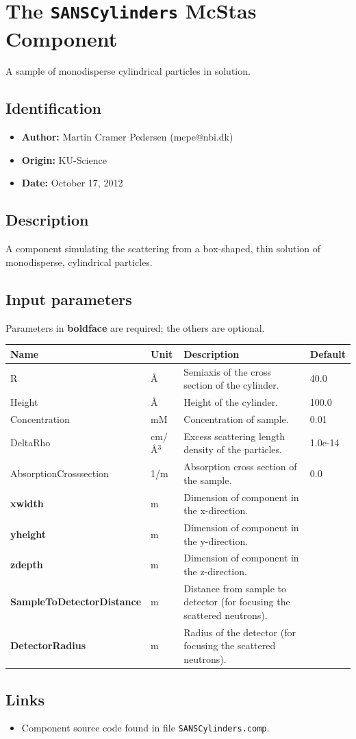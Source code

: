 \section{The \texttt{SANSCylinders} McStas Component}
A sample of monodisperse cylindrical particles in solution.

\subsection*{Identification}
\begin{itemize}
  \item \textbf{Author:} Martin Cramer Pedersen (mcpe@nbi.dk)
  \item \textbf{Origin:} KU-Science
  \item \textbf{Date:} October 17, 2012
\end{itemize}

\subsection*{Description}
A component simulating the scattering from a box-shaped, thin solution of monodisperse, cylindrical particles.

\subsection*{Input parameters}
Parameters in \textbf{boldface} are required; the others are optional.

\begin{longtable}{p{}p{}p{}p{}}
\toprule
\textbf{Name} & \textbf{Unit} & \textbf{Description} & \textbf{Default} \\
\midrule
\endhead
R & \AA{} & Semiaxis of the cross section of the cylinder. & 40.0 \\
Height & \AA{} & Height of the cylinder. & 100.0 \\
Concentration & mM & Concentration of sample. & 0.01 \\
DeltaRho & cm/\AA{}$^{3}$ & Excess scattering length density of the particles. & 1.0e-14 \\
AbsorptionCrosssection & 1/m & Absorption cross section of the sample. & 0.0 \\
\textbf{xwidth} & m & Dimension of component in the x-direction. &  \\
\textbf{yheight} & m & Dimension of component in the y-direction. &  \\
\textbf{zdepth} & m & Dimension of component in the z-direction. &  \\
\textbf{SampleToDetectorDistance} & m & Distance from sample to detector (for focusing the scattered neutrons). &  \\
\textbf{DetectorRadius} & m & Radius of the detector (for focusing the scattered neutrons). &  \\
\bottomrule
\end{longtable}

\subsection*{Links}
\begin{itemize}
  \item Component source code found in file \texttt{SANSCylinders.comp}.
\end{itemize}
